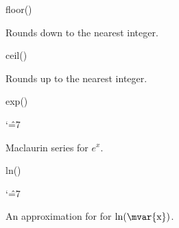 \begin{math-function}{floor()}

	Rounds  down to the nearest integer. 
	
\begin{codeexample}[]
 \pgfmathresult
\end{codeexample}

\begin{codeexample}[]
 \pgfmathresult
\end{codeexample}

\end{math-function}

\begin{math-function}{ceil()}

	Rounds  up to the nearest integer. 

\begin{codeexample}[]
 \pgfmathresult
\end{codeexample}

\begin{codeexample}[]
 \pgfmathresult
\end{codeexample}

\end{math-function}

\begin{math-function}{exp()}
{
\catcode`\^=7

	Maclaurin series for $e^x$. 
}	
\begin{codeexample}[]
 \pgfmathresult
\end{codeexample}

\begin{codeexample}[]
 \pgfmathresult
\end{codeexample}

\end{math-function}


\begin{math-function}{ln()}
{
\catcode`\^=7

	An approximation for for $\ln(\textrm{\mvar{x}})$. 
}	
\begin{codeexample}[]
 \pgfmathresult
\end{codeexample}

\begin{codeexample}[]
 \pgfmathresult
\end{codeexample}

\end{math-function}

